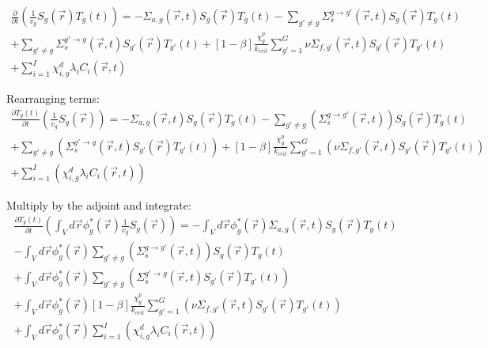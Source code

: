 \documentclass[12pt]{report}
\begin{document}
		\begin{eqnarray}
		\frac{\partial}{\partial t} \left( \frac{1}{v_g}  S_g(\vec{r}) T_g(t) \right) = - \Sigma_{a,g}(\vec{r},t)  S_g(\vec{r}) T_g(t) - \sum_{g' \neq g} \Sigma_{s}^{g\rightarrow g'} (\vec{r},t)  S_g(\vec{r}) T_g(t) \nonumber \\  + \sum_{g' \neq g} \Sigma_{s}^{g'\rightarrow g} (\vec{r},t)  S_{g'}(\vec{r}) T_{g'}(t) 	+ \left[ 1- \beta \right] \frac{\chi_g^p}{k_{crit}} \sum_{g'=1}^{G} \nu \Sigma_{f,g'}(\vec{r},t) S_{g'}(\vec{r}) T_{g'}(t) \nonumber \\ +
		 \sum_{i=1}^{I} \chi_{i,g}^d \lambda_i C_i(\vec{r},t)
		\end{eqnarray}
		
	Rearranging terms:
	\begin{eqnarray} 
	\frac{\partial T_g(t)}{\partial t} \left( \frac{1}{v_g}  S_g(\vec{r}) \right) = - \Sigma_{a,g}(\vec{r},t)  S_g(\vec{r}) T_g(t) - \sum_{g'\neq g} \left( \Sigma_{s}^{g\rightarrow g'}(\vec{r},t) \right)  S_g(\vec{r}) T_g(t) \nonumber \\  + \sum_{g'\neq g} \left( \Sigma_{s}^{g'\rightarrow g} (\vec{r},t)  S_{g'}(\vec{r}) T_{g'}(t) \right) + \left[ 1- \beta \right] \frac{\chi_g^p}{k_{crit}} \sum_{g'=1}^{G} \left( \nu \Sigma_{f,g'}(\vec{r},t) S_{g'}(\vec{r}) T_{g'}(t) \right) \nonumber \\ +
	\sum_{i=1}^{I} \left( \chi_{i,g}^d \lambda_i C_i(\vec{r},t) \right)
	\end{eqnarray}
	
	Multiply by the adjoint and integrate:
	\begin{eqnarray} 
	\frac{\partial T_g(t)}{\partial t} \left( \int_{V} d\vec{r} \phi_g^*(\vec{r}) \frac{1}{v_g}  S_g(\vec{r}) \right) = - \int_{V} d\vec{r} \phi_g^*(\vec{r}) \Sigma_{a,g}(\vec{r},t)  S_g(\vec{r}) T_g(t) \nonumber \\
	- \int_{V} d\vec{r} \phi_g^*(\vec{r}) \sum_{g'\neq g} \left( \Sigma_{s}^{g\rightarrow g'}(\vec{r},t) \right)  S_g(\vec{r}) T_g(t) \nonumber \\
	  + \int_{V} d\vec{r} \phi_g^*(\vec{r}) \sum_{g'\neq g} \left( \Sigma_{s}^{g'\rightarrow g} (\vec{r},t)  S_{g'}(\vec{r}) T_{g'}(t) \right) \nonumber \\
	  + \int_{V} d\vec{r} \phi_g^*(\vec{r}) \left[ 1- \beta \right] \frac{\chi_g^p}{k_{crit}} \sum_{g'=1}^{G} \left( \nu \Sigma_{f,g'}(\vec{r},t) S_{g'}(\vec{r}) T_{g'}(t) \right) \nonumber \\ +
	\int_{V} d\vec{r} \phi_g^*(\vec{r}) \sum_{i=1}^{I} \left( \chi_{i,g}^d \lambda_i C_i(\vec{r},t) \right)
	\end{eqnarray}
	
\end{document}
